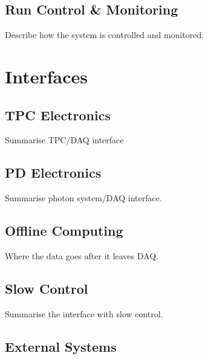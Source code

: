 \subsection{Run Control \& Monitoring}
\label{sec:fdsp-daq-tcm}

Describe how the system is controlled and monitored.


\section{Interfaces}
\label{sec:fdsp-daq-intfc}


\subsection{TPC Electronics}
\label{sec:fdsp-daq-intfc-elec}

Summarise TPC/DAQ interface

\subsection{PD Electronics}
\label{sec:fdsp-daq-intfc-photon}

Summarise photon system/DAQ interface.

\subsection{Offline Computing}
\label{sec:fdsp-daq-intfc-fnal-cmptg}

Where the data goes after it leaves DAQ.

\subsection{Slow Control}
\label{sec:fdsp-daq-intfc-ext}

Summarise the interface with slow control.


\subsection{External Systems}
\label{sec:fdsp-daq-intfc-ext}

